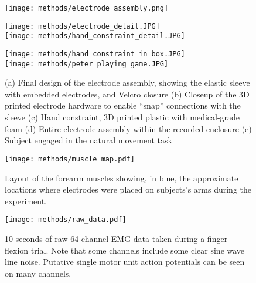 \documentclass[../main.tex]{subfiles}
\begin{document}
\begin{figure}[!htb]
  \centering
  \begin{minipage}{0.33\textwidth}
    \texttt{[image: methods/electrode\_assembly.png]}
    \subcaption{}
  \end{minipage}%
  \hspace*{5pt}
  \begin{minipage}{0.33\textwidth}
    \texttt{[image: methods/electrode\_detail.JPG]}\\
    \subcaption{}
    \texttt{[image: methods/hand\_constraint\_detail.JPG]}
    \subcaption{}
  \end{minipage}%
  \hspace*{5pt}
  \begin{minipage}{0.33\textwidth}
    \texttt{[image: methods/hand\_constraint\_in\_box.JPG]}\\
    \subcaption{}
    \texttt{[image: methods/peter\_playing\_game.JPG]}
    \subcaption{}
  \end{minipage}
  \caption[Final experimental setup]{(a) Final design of the electrode assembly, showing the elastic sleeve with embedded electrodes, and Velcro closure (b) Closeup of the 3D printed electrode hardware to enable ``snap'' connections with the sleeve (c) Hand constraint, 3D printed plastic with medical-grade foam (d) Entire electrode assembly within the recorded enclosure (e) Subject engaged in the natural movement task}\label{fig:final_setup}
\end{figure}

\begin{figure}[!htb]
  \centering
  \texttt{[image: methods/muscle\_map.pdf]}
  \caption[Electrode layout with forearm and hand muscles]{Layout of the forearm muscles showing, in blue, the approximate locations where electrodes were placed on subjects's arms during the experiment.}\label{fig:muscle_map}
\end{figure}

\begin{figure}[!htb]
  \centering
  \texttt{[image: methods/raw\_data.pdf]}
  \caption[Example raw EMG data]{10 seconds of raw 64-channel EMG data taken during a finger flexion trial. Note that some channels include some clear sine wave line noise. Putative single motor unit action potentials can be seen on many channels.}\label{fig:raw_data}
\end{figure}
\end{document}
